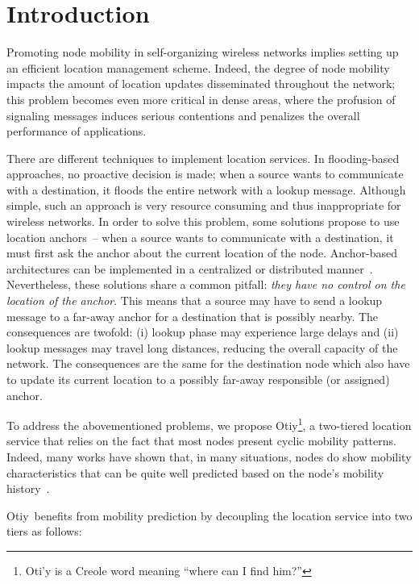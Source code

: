\documentclass[a4paper]{sig-alternate-10pt}
\newcommand{\otiy}{{\sffamily Otiy}}
\begin{document}
\section{Introduction}
\label{sec:introduction}

Promoting node mobility in self-organizing wireless networks implies
setting up an efficient location management scheme. Indeed, the
degree of node mobility impacts the amount of location updates
disseminated throughout the network; this problem becomes even more
critical in dense areas, where the profusion of signaling messages
induces serious contentions and penalizes the overall performance of
applications.

There are different techniques to implement location services. In
flooding-based approaches, no proactive decision is made; when a
source wants to communicate with a destination, it floods the entire
network with a lookup message. Although simple, such an approach is
very resource consuming and thus inappropriate for wireless
networks. In order to solve this problem, some solutions propose to
use location anchors~-- when a source wants to communicate with a
destination, it must first ask the anchor about the current location
of the node. Anchor-based architectures can be implemented in a
centralized or distributed
manner~\cite{mobile-slalom,hubaux01towards,stojmenovic99routing,
woo01scalable}. Nevertheless, these solutions share a common
pitfall: {\it they have no control on the location of the anchor}.
This means that a source may have to send a lookup message to a
far-away anchor for a destination that is possibly nearby. The
consequences are twofold: (i) lookup phase may experience large
delays and (ii) lookup messages may travel long distances, reducing
the overall capacity of the network. The consequences are the same
for the destination node which also have to update its current
location to a possibly far-away responsible (or assigned) anchor.

To address the abovementioned problems, we propose
\otiy\footnote{Oti'y is a Creole word meaning ``where can I find
him?''}, a two-tiered location service that relies on the fact that
most nodes present cyclic mobility patterns. Indeed, many works have
shown that, in many situations, nodes do show mobility
characteristics that can be quite well predicted based on the node's
mobility history~\cite{castro_charac,ghosh_profiling,francois,
wu01personal,spatial_temporal}.

\otiy\ benefits from mobility prediction by decoupling the location
service into two tiers as follows:
\end{document}
